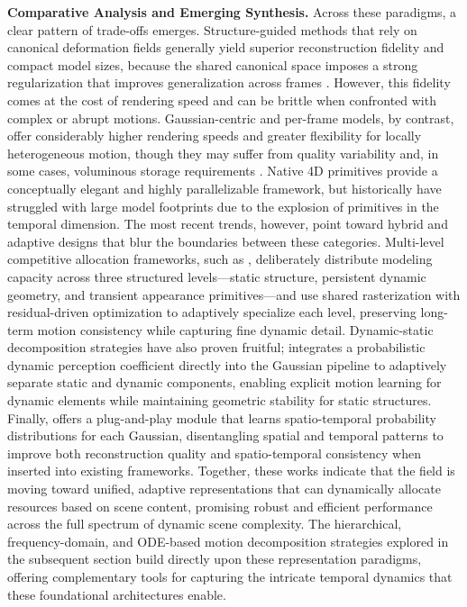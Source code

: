 \documentclass[11pt]{article}
\begin{document}
\textbf{Comparative Analysis and Emerging Synthesis.} Across these paradigms, a clear pattern of trade-offs emerges. Structure-guided methods that rely on canonical deformation fields generally yield superior reconstruction fidelity and compact model sizes, because the shared canonical space imposes a strong regularization that improves generalization across frames \cite{ref341}. However, this fidelity comes at the cost of rendering speed and can be brittle when confronted with complex or abrupt motions. Gaussian-centric and per-frame models, by contrast, offer considerably higher rendering speeds and greater flexibility for locally heterogeneous motion, though they may suffer from quality variability and, in some cases, voluminous storage requirements \cite{ref341}. Native 4D primitives provide a conceptually elegant and highly parallelizable framework, but historically have struggled with large model footprints due to the explosion of primitives in the temporal dimension. The most recent trends, however, point toward hybrid and adaptive designs that blur the boundaries between these categories. Multi-level competitive allocation frameworks, such as \cite{ref342}, deliberately distribute modeling capacity across three structured levels---static structure, persistent dynamic geometry, and transient appearance primitives---and use shared rasterization with residual-driven optimization to adaptively specialize each level, preserving long-term motion consistency while capturing fine dynamic detail. Dynamic-static decomposition strategies have also proven fruitful; \cite{ref343} integrates a probabilistic dynamic perception coefficient directly into the Gaussian pipeline to adaptively separate static and dynamic components, enabling explicit motion learning for dynamic elements while maintaining geometric stability for static structures. Finally, \cite{ref344} offers a plug-and-play module that learns spatio-temporal probability distributions for each Gaussian, disentangling spatial and temporal patterns to improve both reconstruction quality and spatio-temporal consistency when inserted into existing frameworks. Together, these works indicate that the field is moving toward unified, adaptive representations that can dynamically allocate resources based on scene content, promising robust and efficient performance across the full spectrum of dynamic scene complexity. The hierarchical, frequency-domain, and ODE-based motion decomposition strategies explored in the subsequent section build directly upon these representation paradigms, offering complementary tools for capturing the intricate temporal dynamics that these foundational architectures enable.
\end{document}
